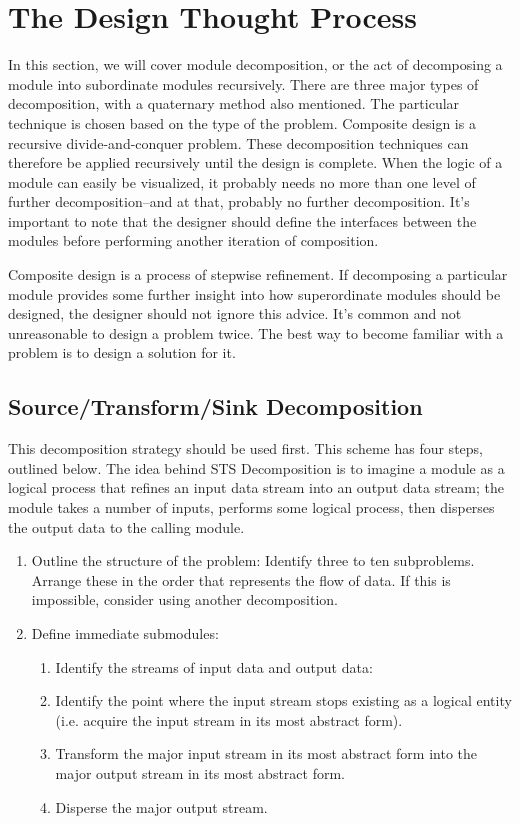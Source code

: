 \documentclass{designdoc}
\begin{document}
\section{The Design Thought Process}
In this section, we will cover module decomposition, or the act of decomposing
a module into subordinate modules recursively. There are three major types of
decomposition, with a quaternary method also mentioned. The particular
technique is chosen based on the type of the problem. Composite design is a
recursive divide-and-conquer problem. These decomposition techniques can
therefore be applied recursively until the design is complete. When the logic
of a module can easily be visualized, it probably needs no more than one level
of further decomposition--and at that, probably no further decomposition. It's
important to note that the designer should define the interfaces between the
modules before performing another iteration of composition.

Composite design is a process of stepwise refinement. If decomposing a
particular module provides some further insight into how superordinate modules
should be designed, the designer should not ignore this advice. It's common and
not unreasonable to design a problem twice. The best way to become familiar
with a problem is to design a solution for it.

\subsection{Source/Transform/Sink Decomposition}
This decomposition strategy should be used first. This scheme has four steps,
outlined below. The idea behind STS Decomposition is to imagine a module as a
logical process that refines an input data stream into an output data stream;
the module takes a number of inputs, performs some logical process, then
disperses the output data to the calling module.
\begin{enumerate}
\item Outline the structure of the problem:
  Identify three to ten subproblems. Arrange these in the order that represents
  the flow of data. If this is impossible, consider using another
  decomposition.
\item Define immediate submodules:
  \begin{enumerate}
  \item Identify the streams of input data and output data:
  \item Identify the point where the input stream stops existing as a logical
    entity (i.e. acquire the input stream in its most abstract form).
  \item Transform the major input stream in its most abstract form into the
    major output stream in its most abstract form.
  \item Disperse the major output stream.
  \end{enumerate}
\end{enumerate}
\end{document}
